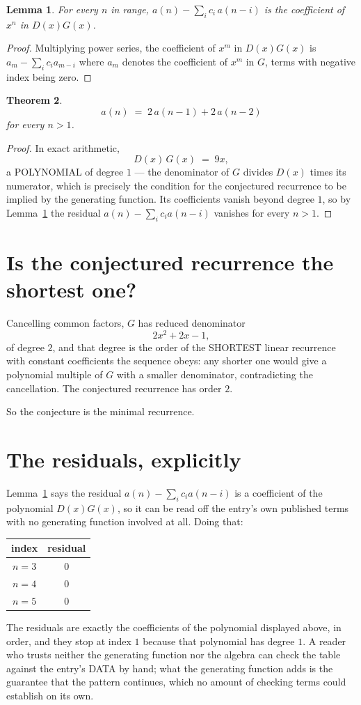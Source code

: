 \documentclass[11pt,a4paper]{article}
\theoremstyle{plain}
\newtheorem{theorem}{Theorem}
\newtheorem{lemma}[theorem]{Lemma}
\theoremstyle{definition}
\begin{document}
\begin{lemma}\label{lem:key}
For every $n$ in range, $a(n)-\sum_i c_i\,a(n-i)$ is the coefficient of $x^{n}$ in
$D(x)G(x)$.
\end{lemma}

\begin{proof}
Multiplying power series, the coefficient of $x^{m}$ in $D(x)G(x)$ is
$a_m-\sum_i c_i a_{m-i}$ where $a_m$ denotes the coefficient of $x^{m}$ in $G$, terms with
negative index being zero.
\end{proof}

\begin{theorem}
\[
a(n)\;=\;2\,a(n-1) + 2\,a(n-2)
\]
for every $n>1$.
\end{theorem}

\begin{proof}
In exact arithmetic,
\[
D(x)\,G(x)\;=\;9 x,
\]
a POLYNOMIAL of degree $1$ --- the denominator of $G$ divides $D(x)$ times its numerator,
which is precisely the condition for the conjectured recurrence to be implied by the
generating function. Its coefficients vanish beyond degree $1$, so by
Lemma~\ref{lem:key} the residual $a(n)-\sum_ic_ia(n-i)$ vanishes for every
$n>1$.
\end{proof}

\section{Is the conjectured recurrence the shortest one?}

Cancelling common factors, $G$ has reduced denominator
\[
2 x^{2} + 2 x - 1,
\]
of degree $2$, and that degree is the order of the SHORTEST linear recurrence with
constant coefficients the sequence obeys: any shorter one would give a polynomial multiple of
$G$ with a smaller denominator, contradicting the cancellation. The conjectured recurrence has
order $2$.

So the conjecture is the minimal recurrence.

\section{The residuals, explicitly}

Lemma~\ref{lem:key} says the residual $a(n)-\sum_ic_ia(n-i)$ is a coefficient of the
polynomial $D(x)G(x)$, so it can be read off the entry's own published terms with no
generating function involved at all. Doing that:
\begin{center}
\begin{tabular}{cc}
index & residual \\ \hline
$n=3$ & $0$ \\
$n=4$ & $0$ \\
$n=5$ & $0$
\end{tabular}
\end{center}
The residuals are exactly the coefficients of the polynomial displayed above, in order, and
they stop at index $1$ because that polynomial has degree $1$. A reader who trusts
neither the generating function nor the algebra can check the table against the entry's DATA
by hand; what the generating function adds is the guarantee that the pattern continues, which
no amount of checking terms could establish on its own.
\end{document}
